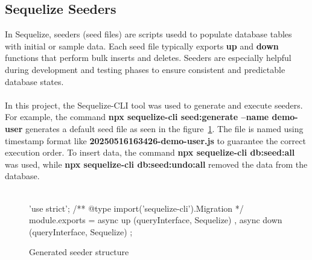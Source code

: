 \documentclass[a4paper,12pt]{report}
\begin{document}
\subsection{Sequelize Seeders}
In Sequelize, seeders (seed files) are scripts usedd to populate database tables with initial or sample data. Each seed file typically exports \textbf{up} and \textbf{down} functions that perform bulk inserts and deletes. Seeders are especially helpful during development and testing phases to ensure consistent and predictable database states.\parencite{sequelizemigrations}\\\\
In this project, the Sequelize-CLI tool was used to generate and execute seeders. For example, the command \textbf{npx sequelize-cli seed:generate --name demo-user} generates a default seed file as seen in the figure~\ref{fig:generated_seeder}. The file is named using timestamp format like \textbf{20250516163426-demo-user.js} to guarantee the correct execution order. To insert data, the command \textbf{npx sequelize-cli db:seed:all} was used, while \textbf{npx sequelize-cli db:seed:undo:all} removed the data from the database.\\\\
\begin{figure}[H]
	\begin{code}
		'use strict';
		/** @type {import('sequelize-cli').Migration} */
		module.exports = {
			async up (queryInterface, Sequelize) {
			},
			async down (queryInterface, Sequelize) {
			}
		};
	\end{code}
	\caption{Generated seeder structure}
	\label{fig:generated_seeder}
\end{figure}
\end{document}

